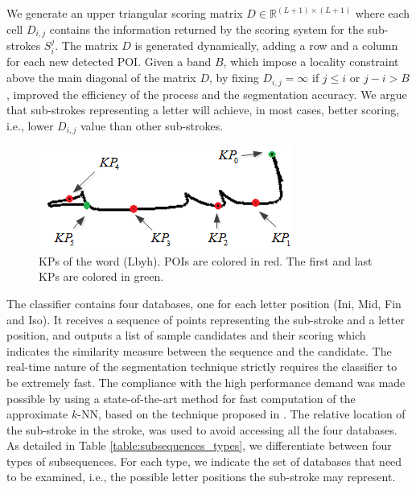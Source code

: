 \documentclass[10pt, conference, compsocconf]{IEEEtran}
\begin{document}
We generate an upper triangular scoring matrix $D\in\mathbb{R}^{(L+1)\times (L+1)}$ where each cell $D_{i,j}$ contains the information returned by the scoring system for the sub-strokes $S_i^j$. 
The matrix $D$ is generated dynamically, adding a row and a column for each new detected POI.
Given a band $B$, which impose a locality constraint above the main diagonal of the matrix $D$, by fixing $D_{i,j}=\infty$ if  $j \leq i$ or $j-i>B$, improved the efficiency of the process and the segmentation accuracy. 
We argue that sub-strokes representing a letter will achieve, in most cases, better scoring, i.e., lower $D_{i,j}$ value than other sub-strokes.
\begin{figure}
\centering
\includegraphics[width=0.6\columnwidth]{./figures/candidate_points}
\caption{KPs of the word  (Lbyh). POIs are colored in red. The first and last KPs are colored in green.}
\label{fig:candidate_points}
\end{figure}

The classifier contains four databases, one for each letter position (Ini, Mid, Fin and Iso). 
It receives a sequence of points representing the sub-stroke and a letter position, and outputs a list of sample candidates and their scoring which indicates the similarity measure between the sequence and the candidate.
The real-time nature of the segmentation technique strictly requires the classifier to be extremely fast.
The compliance with the high performance demand was made possible by using a state-of-the-art method for fast computation of the approximate $k$-NN, based on the technique proposed in \cite{saabni2013efficient}.
The relative location of the sub-stroke in the stroke, was used to avoid accessing all the four databases. 
As detailed in Table \ref{table:subsequences_types}, we differentiate between four types of subsequences. 
For each type, we indicate the set of databases that need to be examined, i.e., the possible letter positions the sub-stroke may represent. 
\end{document}
